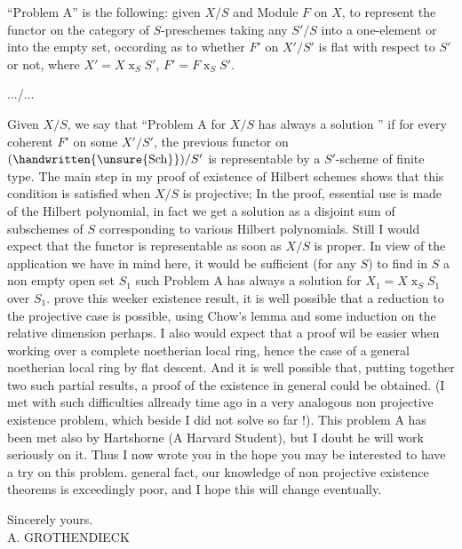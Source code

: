 ``Problem A'' is the following: given $X/S$ and Module $F$ on $X$, to represent the functor on the category of $S$-preschemes taking any $S'/S$ into a one-element or into the empty set, occording as to whether $F'$ on $X'/S'$ is flat with respect to $S'$ or not, where $X'=X\mathbin{x}_{S}S'$, $F'=F\mathbin{x}_{S}S'$.

\hfill .../...\par
Given $X/S$, we say that ``Problem A for $X/S$ has always a solution '' if for every coherent $F'$ on some $X'/S'$, the previous functor on $(\handwritten{\unsure{\mathrm{Sch}}})/S'$ is representable by a $S'$-scheme of finite type. The main step in my proof of existence of Hilbert schemes shows that this condition is satisfied when $X/S$ is projective; In the proof, essential use is made of the Hilbert polynomial, in fact we get a solution as a disjoint sum of subschemes of $S$ corresponding to various Hilbert polynomials. Still I would expect that the functor is representable as soon as $X/S$ is proper. In view of the application we have in mind here, it would be sufficient (for any  $S$) to find in $S$ a non empty open set $S_{1}$ such Problem A has always a solution for $X_{1}=X\mathbin{x}_{S}S_{1}$ over $S_{1}$.  prove this weeker existence result, it is well possible that a reduction to the projective case is possible, using Chow's lemma and some induction on the relative dimension perhaps. I also would expect that a proof wil be easier when working over a complete noetherian local ring, hence the case of a general noetherian local ring by flat descent. And it is well possible that, putting together two such partial results, a proof of the existence in general could be obtained. (I met with such difficulties allready time ago in a very analogous non projective existence problem, which beside I did not solve so far !). This problem A has been met also by Hartshorne (A Harvard Student), but I doubt he will work seriously on it. Thus I now wrote you in the hope you may be interested to have a try on this problem.  general fact, our knowledge of non projective existence theorems is exceedingly poor, and I hope this will change eventually.

Sincerely yours.\\

A. GROTHENDIECK\\

\\

